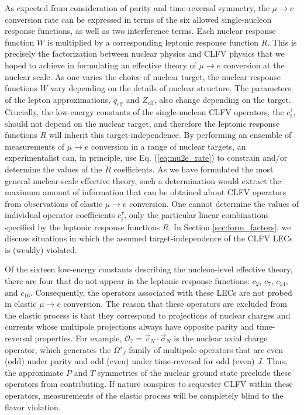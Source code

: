 \documentclass{book}[letterpaper,12pt]
\begin{document}
As expected from consideration of parity and time-reversal symmetry, the $\mu\rightarrow e$ conversion rate can be expressed in terms of the six allowed single-nucleon response functions, as well as two interference terms. Each nuclear response function $W$ is multiplied by a corresponding leptonic response function $R$. This is precisely the factorization between nuclear physics and CLFV physics that we hoped to achieve in formulating an effective theory of $\mu\rightarrow e$ conversion at the nuclear scale. As one varies the choice of nuclear target, the nuclear response functions $W$ vary depending on the details of nuclear structure. The parameters of the lepton approximations, $q_\mathrm{eff}$ and $Z_\mathrm{eff}$, also change depending on the target. Crucially, the low-energy constants of the single-nucleon CLFV operators, the $c_i^{\tau}$, should not depend on the nuclear target, and therefore the leptonic response functions $R$ will inherit this target-independence. By performing an ensemble of measurements of $\mu\rightarrow e$ conversion in a range of nuclear targets, an experimentalist can, in principle, use Eq. (\ref{eq:mu2e_rate}) to constrain and/or determine the values of the $R$ coefficients. As we have formulated the most general nuclear-scale effective theory, such a determination would extract the maximum amount of information that can be obtained about CLFV operators from observations of elastic $\mu\rightarrow e$ conversion. One cannot determine the values of individual operator coefficients $c_i^{\tau}$, only the particular linear combinations specified by the leptonic response functions $R$. In Section \ref{sec:form_factors}, we discuss situations in which the assumed target-independence of the CLFV LECs is (weakly) violated.  

Of the sixteen low-energy constants describing the nucleon-level effective theory, there are four that do not appear in the leptonic response functions: $c_2$, $c_7$, $c_{14}$, and $c_{16}$. Consequently, the operators associated with these LECs are not probed in elastic $\mu\rightarrow e$ conversion. The reason that these operators are excluded from the elastic process is that they correspond to projections of nuclear charges and currents whose multipole projections always have opposite parity and time-reversal properties. For example, $\mathcal{O}_7=\vec{v}_N\cdot\vec{\sigma}_N$ is the nuclear axial charge operator, which generates the $\Omega'_J$ family of multipole operators that are even (odd) under parity and odd (even) under time-reversal for odd (even) $J$. Thus, the approximate $P$ and $T$ symmetries of the nuclear ground state preclude these operators from contributing. If nature conspires to sequester CLFV within these operators, measurements of the elastic process will be completely blind to the flavor violation. 
\end{document}
